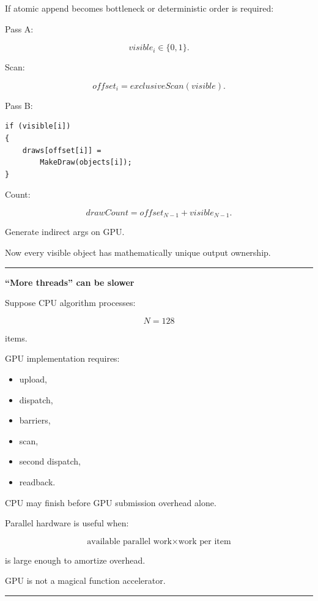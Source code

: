 If atomic append becomes bottleneck or deterministic order is required:

Pass A:

\[
visible_i\in\{0,1\}.
\]

Scan:

\[
offset_i=
exclusiveScan(visible).
\]

Pass B:

\protect{}\label{p10-scan-cull}%
\begin{verbatim}
if (visible[i])
{
    draws[offset[i]] =
        MakeDraw(objects[i]);
}
\end{verbatim}

Count:

\[
drawCount=
offset_{N-1}
+
visible_{N-1}.
\]

Generate indirect args on GPU.

Now every visible object has mathematically unique output ownership.

\begin{center}\rule{0.5\linewidth}{0.5pt}\end{center}

\textbf{``More threads'' can be slower}

Suppose CPU algorithm processes:

\[
N=128
\]

items.

GPU implementation requires:

\begin{itemize}
\tightlist
\item
  upload,
\item
  dispatch,
\item
  barriers,
\item
  scan,
\item
  second dispatch,
\item
  readback.
\end{itemize}

CPU may finish before GPU submission overhead alone.

Parallel hardware is useful when:

\[
\boxed{
\text{available parallel work}
\times
\text{work per item}
}
\]

is large enough to amortize overhead.

GPU is not a magical function accelerator.

\begin{center}\rule{0.5\linewidth}{0.5pt}\end{center}

